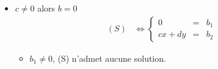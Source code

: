 \documentclass{article}
\renewenvironment{question_kholle}[2][ ]
{
	\subsection{\texorpdfstring{#2}{}}
	\notblank{#1}
	{
		\noindent #1
		\bigbreak
	}
	{}
	\begin{proof}
}
{
	\end{proof}
}
\begin{document}
\begin{question_kholle}
\begin{itemize}[label=$\bullet$ Supposons]
\begin{itemize}[label=$\bullet$ Si]
\begin{itemize}[label=$\bullet$ Si]
\begin{itemize}[label=$\bullet$ Si]
                          \end{itemize}
                    \item $b \neq 0$
                          \begin{equation*}
                            (S) \iff
                            \left\{ \begin{array}{ccc}
                              y & = & \frac{b_1}{b}        \\
                              0 & = & b_2 - \frac{db_1}{b}
                            \end{array} \right.
                          \end{equation*}
                          \begin{itemize}[label=$\bullet$ Si]
                            \item $b_2 - \frac{db_1}{b} \neq 0$, (S) n'admet aucune solution.
                            \item $b_2 - \frac{db_1}{b} = 0$, $(S) \iff y = \frac{b_1}{b} \iff \begin{pmatrix} x \\ y \end{pmatrix} \in \begin{Bmatrix} \begin{pmatrix} t \\ \frac{b_1}{d} \end{pmatrix} |\; t \in \K \end{Bmatrix}$ donc (S) admet une droite affine de solutions.
                          \end{itemize}
                  \end{itemize}
            \item $c \neq 0$ alors $b = 0$
                  \begin{equation*}
                    \begin{aligned}
                      (S)
                       & \iff \left\{ \begin{array}{ccc}
                                        0       & = & b_1 \\
                                        cx + dy & = & b_2
                                      \end{array} \right.
                    \end{aligned}
                  \end{equation*}
                  \begin{itemize}[label=$\bullet$ Si]
                    \item $b_1 \neq 0$, (S) n'admet aucune solution.

\end{itemize}
\end{itemize}
\end{itemize}
\end{question_kholle}
\end{document}
